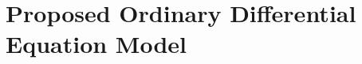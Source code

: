 \documentclass[letterpaper]{article}
\newcommand{\sitem}[1]
{
    \begin{itemize}
        \item #1
    \end{itemize}
}
\begin{document}
  \section{Proposed Ordinary Differential Equation Model}
\end{document}
